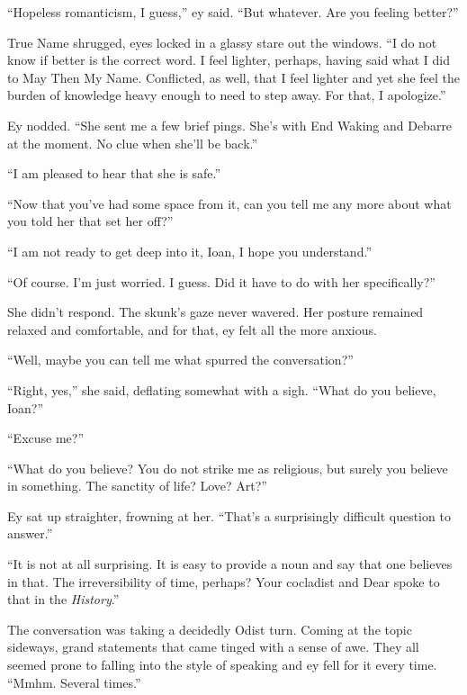 ``Hopeless romanticism, I guess,'' ey said. ``But whatever. Are you feeling better?''

True Name shrugged, eyes locked in a glassy stare out the windows. ``I do not know if better is the correct word. I feel lighter, perhaps, having said what I did to May Then My Name. Conflicted, as well, that I feel lighter and yet she feel the burden of knowledge heavy enough to need to step away. For that, I apologize.''

Ey nodded. ``She sent me a few brief pings. She's with End Waking and Debarre at the moment. No clue when she'll be back.''

``I am pleased to hear that she is safe.''

``Now that you've had some space from it, can you tell me any more about what you told her that set her off?''

``I am not ready to get deep into it, Ioan, I hope you understand.''

``Of course. I'm just worried. I guess. Did it have to do with her specifically?''

She didn't respond. The skunk's gaze never wavered. Her posture remained relaxed and comfortable, and for that, ey felt all the more anxious.

``Well, maybe you can tell me what spurred the conversation?''

``Right, yes,'' she said, deflating somewhat with a sigh. ``What do you believe, Ioan?''

``Excuse me?''

``What do you believe? You do not strike me as religious, but surely you believe in something. The sanctity of life? Love? Art?''

Ey sat up straighter, frowning at her. ``That's a surprisingly difficult question to answer.''

``It is not at all surprising. It is easy to provide a noun and say that one believes in that. The irreversibility of time, perhaps? Your cocladist and Dear spoke to that in the \emph{History}.''

The conversation was taking a decidedly Odist turn. Coming at the topic sideways, grand statements that came tinged with a sense of awe. They all seemed prone to falling into the style of speaking and ey fell for it every time. ``Mmhm. Several times.''

